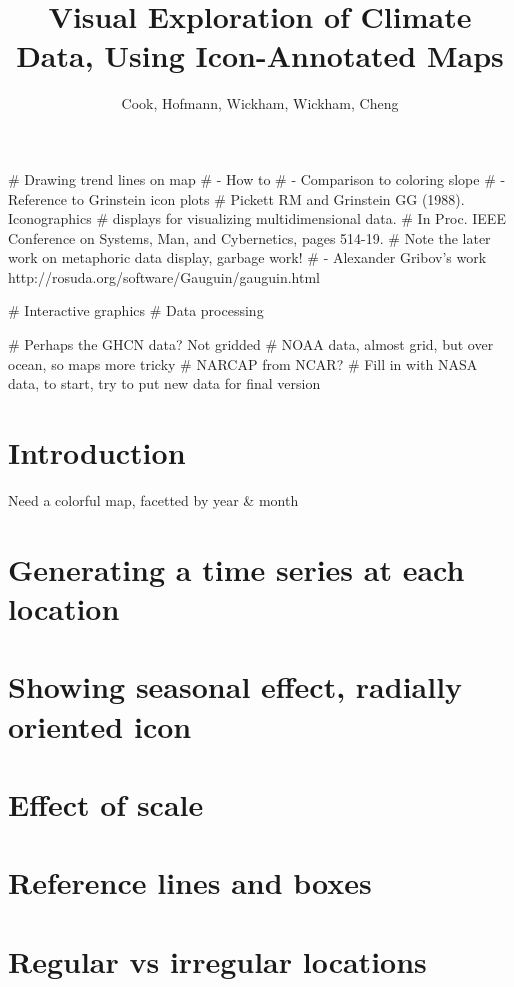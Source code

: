 \documentclass{article}
\begin{document}
\title{Visual Exploration of Climate Data, Using Icon-Annotated Maps}
\author{Cook, Hofmann, Wickham, Wickham, Cheng}

# Drawing trend lines on map
#   - How to
#   - Comparison to coloring slope
#   - Reference to Grinstein icon plots
# Pickett RM and Grinstein GG (1988). Iconographics 
# displays for visualizing multidimensional data. 
# In Proc. IEEE Conference on Systems, Man, and Cybernetics, pages 514-19.
# Note the later work on metaphoric data display, garbage work!
#   - Alexander Gribov's work http://rosuda.org/software/Gauguin/gauguin.html

# Interactive graphics
# Data processing

# Perhaps the GHCN data? Not gridded
# NOAA data, almost grid, but over ocean, so maps more tricky
# NARCAP from NCAR?
# Fill in with NASA data, to start, try to put new data for final version

\section{Introduction}

Need a colorful map, facetted by year \& month

\section{Generating a time series at each location}

\section{Showing seasonal effect, radially oriented icon}

\section{Effect of scale}

\section{Reference lines and boxes}

\section{Regular vs irregular locations}
\end{document}
